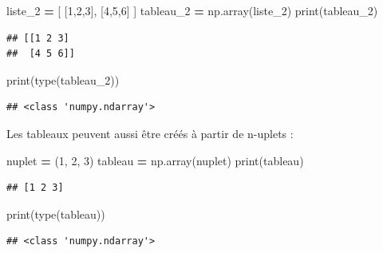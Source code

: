 \documentclass[12pt,]{book}
\newenvironment{Shaded}{\begin{snugshade}}{\end{snugshade}}
\newcommand{\DecValTok}[1]{\textcolor[rgb]{0.00,0.00,0.81}{#1}}
\newcommand{\OperatorTok}[1]{\textcolor[rgb]{0.81,0.36,0.00}{\textbf{#1}}}
\newcommand{\BuiltInTok}[1]{#1}
\newcommand{\NormalTok}[1]{#1}
\numberwithin{equation}{section}
\numberwithin{countremarque}{section}
\begin{document}
\begin{Shaded}
\begin{Highlighting}[]
\NormalTok{liste_2 }\OperatorTok{=}\NormalTok{ [ [}\DecValTok{1}\NormalTok{,}\DecValTok{2}\NormalTok{,}\DecValTok{3}\NormalTok{], [}\DecValTok{4}\NormalTok{,}\DecValTok{5}\NormalTok{,}\DecValTok{6}\NormalTok{] ]}
\NormalTok{tableau_2 }\OperatorTok{=}\NormalTok{ np.array(liste_2)}
\BuiltInTok{print}\NormalTok{(tableau_2)}
\end{Highlighting}
\end{Shaded}

\begin{lstlisting}
## [[1 2 3]
##  [4 5 6]]
\end{lstlisting}

\begin{Shaded}
\begin{Highlighting}[]
\BuiltInTok{print}\NormalTok{(}\BuiltInTok{type}\NormalTok{(tableau_2))}
\end{Highlighting}
\end{Shaded}

\begin{lstlisting}
## <class 'numpy.ndarray'>
\end{lstlisting}

Les tableaux peuvent aussi être créés à partir de n-uplets :

\begin{Shaded}
\begin{Highlighting}[]
\NormalTok{nuplet }\OperatorTok{=}\NormalTok{ (}\DecValTok{1}\NormalTok{, }\DecValTok{2}\NormalTok{, }\DecValTok{3}\NormalTok{)}
\NormalTok{tableau }\OperatorTok{=}\NormalTok{ np.array(nuplet)}
\BuiltInTok{print}\NormalTok{(tableau)}
\end{Highlighting}
\end{Shaded}

\begin{lstlisting}
## [1 2 3]
\end{lstlisting}

\begin{Shaded}
\begin{Highlighting}[]
\BuiltInTok{print}\NormalTok{(}\BuiltInTok{type}\NormalTok{(tableau))}
\end{Highlighting}
\end{Shaded}

\begin{lstlisting}
## <class 'numpy.ndarray'>
\end{lstlisting}
\end{document}
